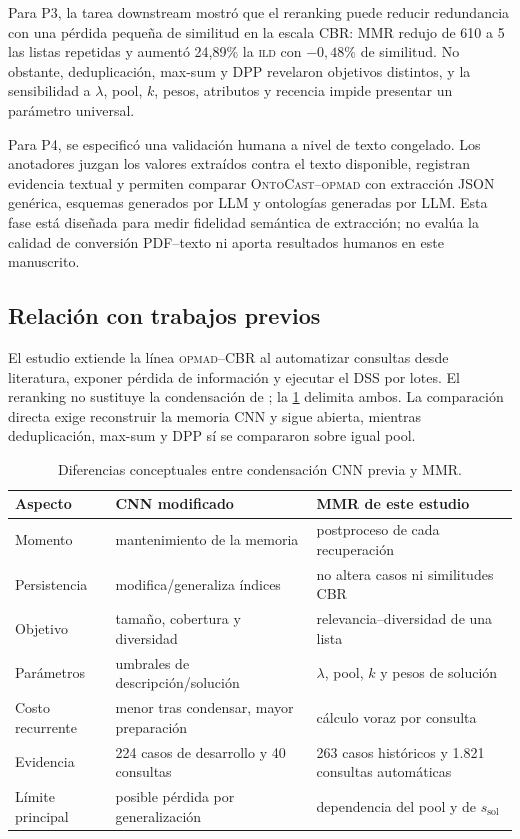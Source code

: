 \documentclass[11pt,a4paper]{article}
\newcommand{\OPMAD}{\textsc{opmad}}
\newcommand{\OntoCast}{\textsc{OntoCast}}
\newcommand{\ILD}{\textsc{ild}}
\begin{document}
Para P3, la tarea downstream mostró que el reranking puede reducir redundancia con una pérdida pequeña de similitud en la escala CBR: MMR redujo de 610 a 5 las listas repetidas y aumentó 24,89\% la \ILD{} con $-0,48\%$ de similitud. No obstante, deduplicación, max-sum y DPP revelaron objetivos distintos, y la sensibilidad a $\lambda$, pool, $k$, pesos, atributos y recencia impide presentar un parámetro universal.

Para P4, se especificó una validación humana a nivel de texto congelado. Los anotadores juzgan los valores extraídos contra el texto disponible, registran evidencia textual y permiten comparar \OntoCast{}--\OPMAD{} con extracción JSON genérica, esquemas generados por LLM y ontologías generadas por LLM. Esta fase está diseñada para medir fidelidad semántica de extracción; no evalúa la calidad de conversión PDF--texto ni aporta resultados humanos en este manuscrito.

\subsection{Relación con trabajos previos}

El estudio extiende la línea \OPMAD{}--CBR \citep{MonteroJimenez2021OPMADCBR,MunozHernandez2021OntologyCBR} al automatizar consultas desde literatura, exponer pérdida de información y ejecutar el DSS por lotes. El reranking no sustituye la condensación de \citet{MunozPena2025Diversity}; la \cref{tab:cnn-mmr} delimita ambos. La comparación directa exige reconstruir la memoria CNN y sigue abierta, mientras deduplicación, max-sum y DPP sí se compararon sobre igual pool.

\begin{table}[H]
\centering
\caption{Diferencias conceptuales entre condensación CNN previa y MMR.}
\label{tab:cnn-mmr}
\small
\begin{tabularx}{\linewidth}{lXX}
\toprule
Aspecto & CNN modificado \citep{MunozPena2025Diversity} & MMR de este estudio \\
\midrule
Momento & mantenimiento de la memoria & postproceso de cada recuperación \\
Persistencia & modifica/generaliza índices & no altera casos ni similitudes CBR \\
Objetivo & tamaño, cobertura y diversidad & relevancia--diversidad de una lista \\
Parámetros & umbrales de descripción/solución & $\lambda$, pool, $k$ y pesos de solución \\
Costo recurrente & menor tras condensar, mayor preparación & cálculo voraz por consulta \\
Evidencia & 224 casos de desarrollo y 40 consultas & 263 casos históricos y 1.821 consultas automáticas \\
Límite principal & posible pérdida por generalización & dependencia del pool y de $s_{\mathrm{sol}}$ \\
\bottomrule
\end{tabularx}
\end{table}
\end{document}

